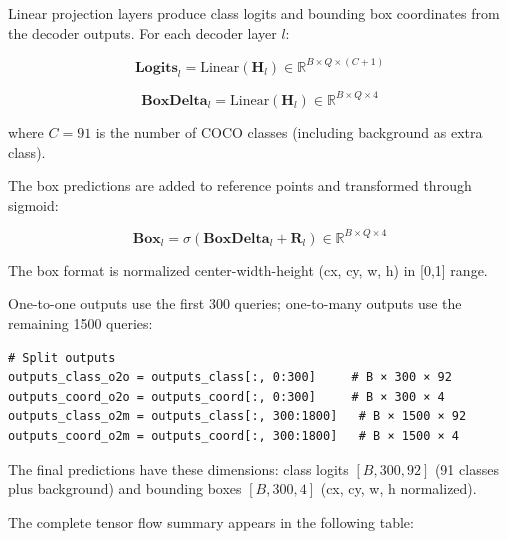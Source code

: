 \documentclass[12pt,a4paper]{article}
\newcommand{\B}[1]{\mathbf{#1}}
\begin{document}
Linear projection layers produce class logits and bounding box coordinates from the decoder outputs. For each decoder layer $l$:

\begin{equation}
\B{Logits}_{l} = \text{Linear}(\B{H}_{l}) \in \mathbb{R}^{B \times Q \times (C+1)}
\end{equation}

\begin{equation}
\B{BoxDelta}_{l} = \text{Linear}(\B{H}_{l}) \in \mathbb{R}^{B \times Q \times 4}
\end{equation}

where $C=91$ is the number of COCO classes (including background as extra class).

The box predictions are added to reference points and transformed through sigmoid:

\begin{equation}
\B{Box}_{l} = \sigma(\B{BoxDelta}_{l} + \B{R}_{l}) \in \mathbb{R}^{B \times Q \times 4}
\end{equation}

The box format is normalized center-width-height (cx, cy, w, h) in [0,1] range.

One-to-one outputs use the first 300 queries; one-to-many outputs use the remaining 1500 queries:

\begin{verbatim}
# Split outputs
outputs_class_o2o = outputs_class[:, 0:300]     # B × 300 × 92
outputs_coord_o2o = outputs_coord[:, 0:300]     # B × 300 × 4
outputs_class_o2m = outputs_class[:, 300:1800]   # B × 1500 × 92
outputs_coord_o2m = outputs_coord[:, 300:1800]   # B × 1500 × 4
\end{verbatim}

The final predictions have these dimensions: class logits $[B, 300, 92]$ (91 classes plus background) and bounding boxes $[B, 300, 4]$ (cx, cy, w, h normalized).

The complete tensor flow summary appears in the following table:
\end{document}
